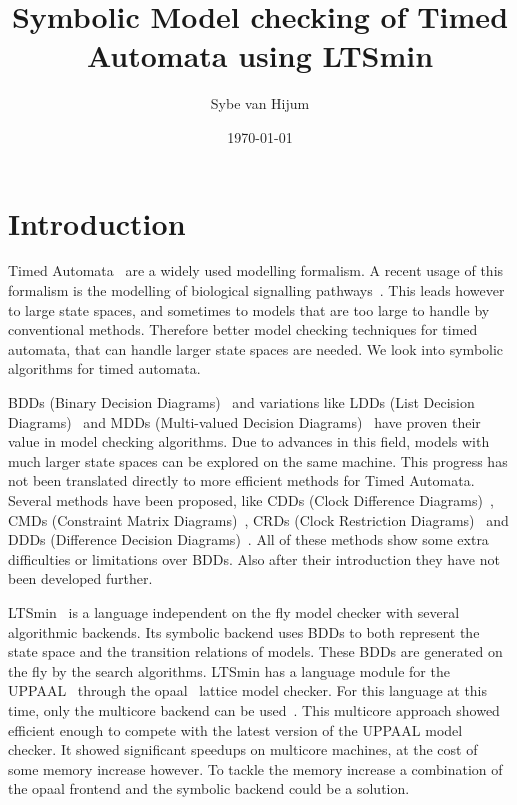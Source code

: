 \documentclass[11pt]{article}
\begin{document}
\newtheorem{mydef}{Definition}
\title{Symbolic Model checking of Timed Automata using LTSmin}
\author{Sybe van Hijum}
\date{\today}
\maketitle

\tableofcontents

\section{Introduction}
Timed Automata~\cite{Alur1994183} are a widely used modelling formalism. A recent usage of this formalism is the modelling of biological signalling pathways~\cite{DBLP:conf/bibe/SchivoSWCVKLPP12}. This leads however to large state spaces, and sometimes to models that are too large to handle by conventional methods. Therefore better model checking techniques for timed automata, that can handle larger state spaces are needed. We look into symbolic algorithms for timed automata.

BDDs (Binary Decision Diagrams)~\cite{Akers:1978:BDD:1310167.1310815,1676819} and variations like LDDs (List Decision Diagrams)~\cite{so62465} and MDDs (Multi-valued Decision Diagrams)~\cite{129849} have proven their value in model checking algorithms. Due to advances in this field, models with much larger state spaces can be explored on the same machine. This progress has not been translated directly to more efficient methods for Timed Automata. Several methods have been proposed, like CDDs (Clock Difference Diagrams)~\cite{BRICS19491}, CMDs (Constraint Matrix Diagrams)~\cite{5702245}, CRDs (Clock Restriction Diagrams)~\cite{crds} and DDDs (Difference Decision Diagrams)~\cite{ddds, ddd-datastructure-99}. All of these methods show some extra difficulties or limitations over BDDs. Also after their introduction they have not been developed further.

LTSmin~\cite{eemcs18152,ltsmin-mc:nmf2011} is a language independent on the fly model checker with several algorithmic backends. Its symbolic backend uses BDDs to both represent the state space and the transition relations of models. These BDDs are generated on the fly by the search algorithms. LTSmin has a language module for the UPPAAL~\cite{UPPAAL} through the opaal~\cite{opaal} lattice model checker. For this language at this time, only the multicore backend can be used~\cite{eemcs21972}. This multicore approach showed efficient enough to compete with the latest version of the UPPAAL model checker. It showed significant speedups on multicore machines, at the cost of some memory increase however. To tackle the memory increase a combination of the opaal frontend and the symbolic backend could be a solution.
\end{document}
